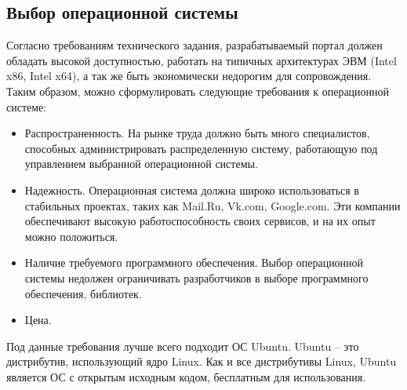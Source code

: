 \subsection*{Выбор операционной системы}
Согласно требованиям технического задания, разрабатываемый портал должен обладать высокой доступностью, работать на типичных архитектурах ЭВМ (Intel x86, Intel x64), а так же быть экономически недорогим для сопровождения. Таким образом, можно сформулировать следующие требования к операционной системе:
\begin{itemize}
    \item Распространенность. На рынке труда должно быть много специалистов, способных администрировать распределенную систему, работающую под управлением выбранной операционной системы.
    \item Надежность. Операционная система должна широко использоваться в стабильных проектах, таких как Mail.Ru, Vk.com, Google.com. Эти компании обеспечивают высокую работоспособность своих сервисов, и на их опыт можно положиться.
    \item Наличие требуемого программного обеспечения. Выбор операционной системы недолжен ограничивать разработчиков в выборе программного обеспечения, библиотек.
    \item Цена.
\end{itemize}

Под данные требования лучше всего подходит ОС Ubuntu. Ubuntu -- это дистрибутив, использующий ядро Linux. Как и все дистрибутивы Linux, Ubuntu является ОС с открытым исходным кодом, бесплатным для использования. 

